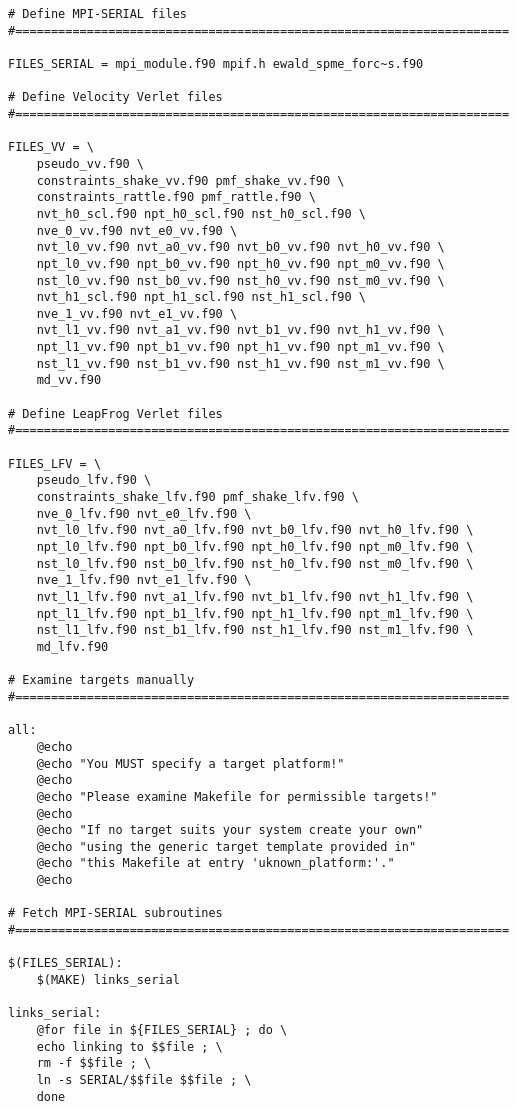 \begin{verbatim}
# Define MPI-SERIAL files
#=====================================================================

FILES_SERIAL = mpi_module.f90 mpif.h ewald_spme_forc~s.f90

# Define Velocity Verlet files
#=====================================================================

FILES_VV = \
	pseudo_vv.f90 \
	constraints_shake_vv.f90 pmf_shake_vv.f90 \
	constraints_rattle.f90 pmf_rattle.f90 \
	nvt_h0_scl.f90 npt_h0_scl.f90 nst_h0_scl.f90 \
	nve_0_vv.f90 nvt_e0_vv.f90 \
	nvt_l0_vv.f90 nvt_a0_vv.f90 nvt_b0_vv.f90 nvt_h0_vv.f90 \
	npt_l0_vv.f90 npt_b0_vv.f90 npt_h0_vv.f90 npt_m0_vv.f90 \
	nst_l0_vv.f90 nst_b0_vv.f90 nst_h0_vv.f90 nst_m0_vv.f90 \
	nvt_h1_scl.f90 npt_h1_scl.f90 nst_h1_scl.f90 \
	nve_1_vv.f90 nvt_e1_vv.f90 \
	nvt_l1_vv.f90 nvt_a1_vv.f90 nvt_b1_vv.f90 nvt_h1_vv.f90 \
	npt_l1_vv.f90 npt_b1_vv.f90 npt_h1_vv.f90 npt_m1_vv.f90 \
	nst_l1_vv.f90 nst_b1_vv.f90 nst_h1_vv.f90 nst_m1_vv.f90 \
	md_vv.f90

# Define LeapFrog Verlet files
#=====================================================================

FILES_LFV = \
	pseudo_lfv.f90 \
	constraints_shake_lfv.f90 pmf_shake_lfv.f90 \
	nve_0_lfv.f90 nvt_e0_lfv.f90 \
	nvt_l0_lfv.f90 nvt_a0_lfv.f90 nvt_b0_lfv.f90 nvt_h0_lfv.f90 \
	npt_l0_lfv.f90 npt_b0_lfv.f90 npt_h0_lfv.f90 npt_m0_lfv.f90 \
	nst_l0_lfv.f90 nst_b0_lfv.f90 nst_h0_lfv.f90 nst_m0_lfv.f90 \
	nve_1_lfv.f90 nvt_e1_lfv.f90 \
	nvt_l1_lfv.f90 nvt_a1_lfv.f90 nvt_b1_lfv.f90 nvt_h1_lfv.f90 \
	npt_l1_lfv.f90 npt_b1_lfv.f90 npt_h1_lfv.f90 npt_m1_lfv.f90 \
	nst_l1_lfv.f90 nst_b1_lfv.f90 nst_h1_lfv.f90 nst_m1_lfv.f90 \
	md_lfv.f90

# Examine targets manually
#=====================================================================

all:
	@echo
	@echo "You MUST specify a target platform!"
	@echo
	@echo "Please examine Makefile for permissible targets!"
	@echo
	@echo "If no target suits your system create your own"
	@echo "using the generic target template provided in"
	@echo "this Makefile at entry 'uknown_platform:'."
	@echo

# Fetch MPI-SERIAL subroutines
#=====================================================================

$(FILES_SERIAL):
	$(MAKE) links_serial

links_serial:
	@for file in ${FILES_SERIAL} ; do \
	echo linking to $$file ; \
	rm -f $$file ; \
	ln -s SERIAL/$$file $$file ; \
	done


\end{verbatim}
